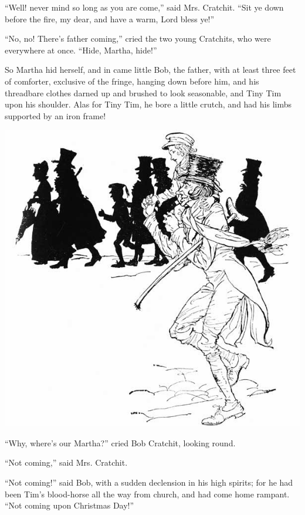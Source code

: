 \documentclass[paper=a5,BCOR=15mm,twoside,DIV=15,headinclude=off,12pt,chapterprefix=off,openany,headings=huge]{scrbook} %
\begin{document}
\enquote{Well! never mind so long as you are come,} said Mrs. Cratchit. \enquote{Sit ye down before the fire, my dear, and have a warm, Lord bless ye!}

\enquote{No, no! There's father coming,} cried the two young Cratchits, who were everywhere at once. \enquote{Hide, Martha, hide!}

So Martha hid herself, and in came little Bob, the father, with at least three feet of comforter, exclusive of the fringe, hanging down before him, and his threadbare clothes darned up and brushed to look seasonable, and Tiny Tim upon his shoulder. Alas for Tiny Tim, he bore a little crutch, and had his limbs supported by an iron frame!

 \begin{center}
     \vfill%
     \includegraphics[width=\columnwidth]{gs109b}
 \end{center}
\clearpage


\enquote{Why, where's our Martha?} cried Bob Cratchit, looking round.

\enquote{Not coming,} said Mrs. Cratchit.


\enquote{Not coming!} said Bob, with a sudden declension in his high spirits; for he had been Tim's blood-horse all the way from church, and had come home rampant. \enquote{Not coming upon Christmas Day!}
\end{document}
